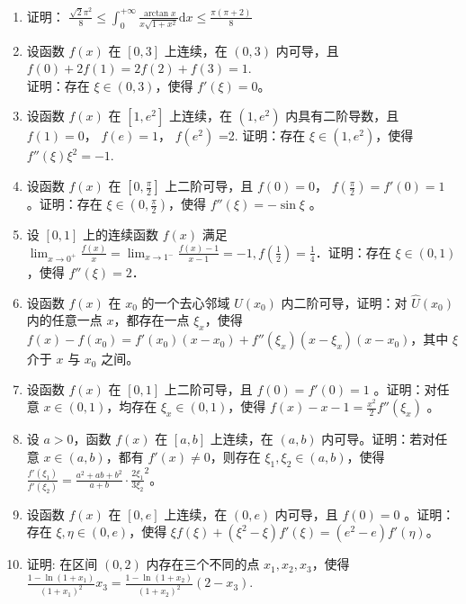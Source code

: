 \documentclass[12pt, a4paper]{ctexart}
\begin{document}
\begin{enumerate}[start=37]
    \item 证明： $ \frac{\sqrt{2}\pi^{2}}{8}\leq\int_{0}^{+\infty}\frac{\arctan x}{x\sqrt{1+x^{2}}}\mathrm{d}x\leq\frac{\pi(\pi+2)}{8} $

    \item 设函数 $ f(x) $ 在 $ [0,3] $ 上连续，在 $ (0,3) $ 内可导，且 $ f(0) + 2f(1) = 2f(2) + f(3) = 1 $.\\
    证明：存在 $ \xi \in (0,3) $，使得 $ f'(\xi) = 0 $。

    \item 设函数 $ f(x) $ 在 $ [1,e^2] $ 上连续，在 $ (1,e^2) $ 内具有二阶导数，且 $ f(1)=0 $， $ f(e)=1 $， $ f(e^2) $ =2. 证明：存在 $ \xi \in (1,e^2) $，使得 $ f''(\xi) \xi^2 = -1 $.

    \item 设函数 $ f(x) $ 在 $ \left[0, \frac{\pi}{2}\right] $ 上二阶可导，且 $ f(0) = 0 $， $ f\left(\frac{\pi}{2}\right) = f'(0) = 1 $ 。证明：存在 $ \xi \in \left(0, \frac{\pi}{2}\right) $，使得 $ f''(\xi) = -\sin\xi $ 。

    \item 设 $ [0,1] $ 上的连续函数 $ f(x) $ 满足 $ \lim_{x\to0^+}\frac{f(x)}{x}=\lim_{x\to1^-}\frac{f(x)-1}{x-1}=-1,f\left(\frac{1}{2}\right)=\frac{1}{4} $．证明：存在 $ \xi\in(0,1) $，使得 $ f''(\xi)=2 $．

    \item 设函数 $ f(x) $ 在 $ x_0 $ 的一个去心邻域 $ U(x_0) $ 内二阶可导，证明：对 $ \hat{U}(x_0) $ 内的任意一点 $ x $，都存在一点 $ \xi_x $，使得 $ f(x) - f(x_0) = f'(x_0)(x - x_0) + f''(\xi_x)(x - \xi_x)(x - x_0) $，其中 $ \xi $ 介于 $ x $ 与 $ x_0 $ 之间。

    \item 设函数 $ f(x) $ 在 $ [0,1] $ 上二阶可导，且 $ f(0) = f'(0) = 1 $ 。证明：对任意 $ x \in (0,1) $，均存在 $ \xi_x \in (0,1) $，使得 $ f(x) - x - 1 = \frac{x^2}{2} f''(\xi_x) $ 。

    \item 设 $a>0$，函数 $f(x)$ 在 $[a,b]$ 上连续，在 $(a,b)$ 内可导。证明：若对任意 $x\in(a,b)$，都有 $f'(x)\neq0$，则存在 $\xi_1,\xi_2\in(a,b)$，使得 $\frac{f'(\xi_1)}{f'(\xi_2)}=\frac{a^2+ab+b^2}{a+b}\cdot\frac{2\xi_1}{3\xi_2}^2$。

    \item 设函数 $ f(x) $ 在 $ [0,e] $ 上连续，在 $ (0,e) $ 内可导，且 $ f(0)=0 $ 。证明：存在 $ \xi, \eta \in (0,e) $，使得 $ \xi f(\xi) + (\xi^2 - \xi) f'(\xi) = (e^2 - e) f'(\eta) $。

    \item 证明: 在区间 $ (0,2) $ 内存在三个不同的点 $ x_{1}, x_{2}, x_{3} $，使得 $ \frac{1-\ln(1+x_{1})}{(1+x_{1})^{2}}x_{3}=\frac{1-\ln(1+x_{2})}{(1+x_{2})^{2}}(2-x_{3}) $.


\end{enumerate}
\end{document}
